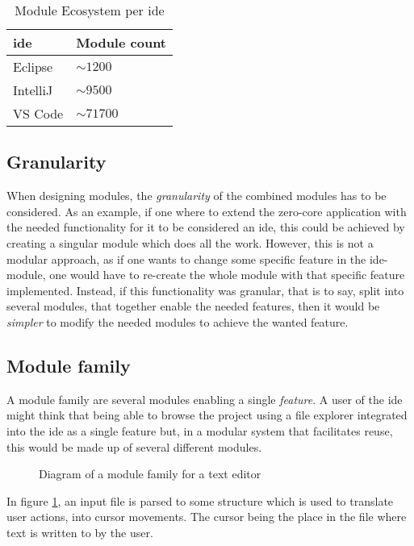 \begin{table}[]
  \centering
  \caption{Module Ecosystem per \gls*{ide}}
  \label{tbl:mod}
  \begin{tabular}{|l|l|}
    \hline
    \gls*{ide} & Module count \\ \hline
    Eclipse & $\sim1200$ \\ \hline
    IntelliJ & $\sim9500$ \\ \hline
    VS Code & $\sim71700$ \\ \hline
  \end{tabular}
\end{table}


\subsection{Granularity}

When designing modules, the \textit{granularity} of the combined modules has to
be considered. As an example, if one where to extend the zero-core application
with the needed functionality for it to be considered an \gls*{ide}, this could be
achieved by creating a singular module which does all the work. However, this
is not a modular approach, as if one wants to change some specific feature in
the \gls*{ide}-module, one would have to re-create the whole module with that
specific feature implemented. Instead, if this functionality was granular,
that is to say, split into several modules, that together enable the needed
features, then it would be \textit{simpler} to modify the needed modules to
achieve the wanted feature.


\subsection{Module family}

A module family are several modules enabling a single
\textit{feature}. A user of the \gls*{ide} might think that being able to browse
the project using a file explorer integrated into the \gls*{ide} as a single
feature but, in a modular system that facilitates reuse, this would be made up
of several different modules.

\begin{figure}[H]
  \centering
  
  \caption{Diagram of a module family for a text editor}
  \label{fig:textEditorSimple}
\end{figure}

In figure \ref{fig:textEditorSimple}, an input file is parsed to some structure
which is used to translate user actions, into cursor movements. The cursor being
the place in the file where text is written to by the user.

